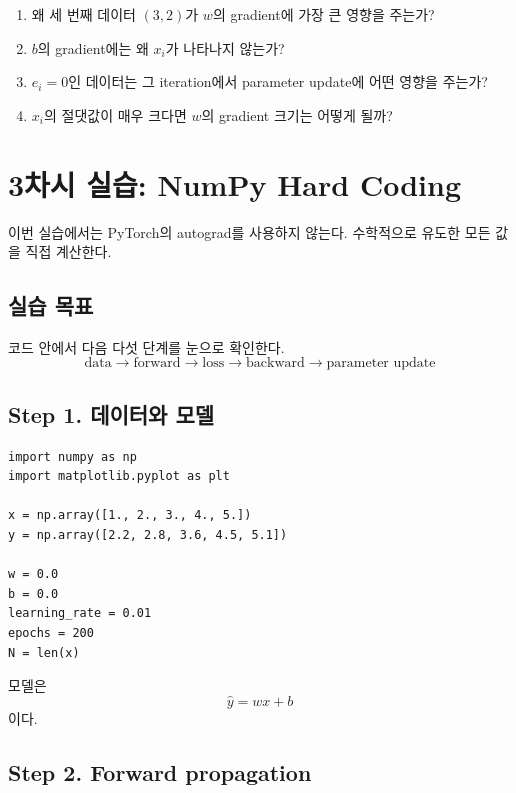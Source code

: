 \documentclass[11pt,a4paper]{article}
\begin{document}
\begin{thinkbox}
\begin{enumerate}[label=(\arabic*)]
\item 왜 세 번째 데이터 $(3,2)$가 $w$의 gradient에 가장 큰 영향을 주는가?
\item $b$의 gradient에는 왜 $x_i$가 나타나지 않는가?
\item $e_i=0$인 데이터는 그 iteration에서 parameter update에 어떤 영향을 주는가?
\item $x_i$의 절댓값이 매우 크다면 $w$의 gradient 크기는 어떻게 될까?
\end{enumerate}
\end{thinkbox}

\section{3차시 실습: NumPy Hard Coding}

이번 실습에서는 PyTorch의 autograd를 사용하지 않는다.
수학적으로 유도한 모든 값을 직접 계산한다.

\subsection{실습 목표}

코드 안에서 다음 다섯 단계를 눈으로 확인한다.
\[
\boxed{
\text{data}
\rightarrow
\text{forward}
\rightarrow
\text{loss}
\rightarrow
\text{backward}
\rightarrow
\text{parameter update}
}
\]

\subsection{Step 1. 데이터와 모델}

\begin{lstlisting}
import numpy as np
import matplotlib.pyplot as plt

x = np.array([1., 2., 3., 4., 5.])
y = np.array([2.2, 2.8, 3.6, 4.5, 5.1])

w = 0.0
b = 0.0
learning_rate = 0.01
epochs = 200
N = len(x)
\end{lstlisting}

모델은
\[
\widehat y=wx+b
\]
이다.

\subsection{Step 2. Forward propagation}
\end{document}
